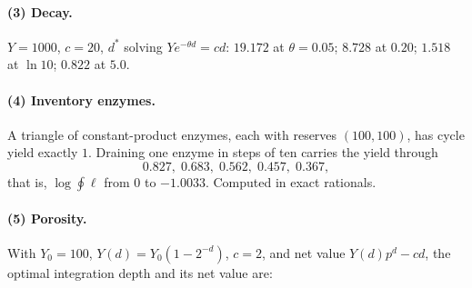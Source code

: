 \paragraph{(3) Decay.} $Y = 1000$, $c = 20$, $d^\ast$ solving
$Ye^{-\theta d} = cd$: $19.172$ at $\theta = 0.05$; $8.728$ at $0.20$;
$1.518$ at $\ln 10$; $0.822$ at $5.0$.

\paragraph{(4) Inventory enzymes.} A triangle of constant-product enzymes,
each with reserves $(100,100)$, has cycle yield exactly $1$. Draining one
enzyme in steps of ten carries the yield through
\[
  0.827,\; 0.683,\; 0.562,\; 0.457,\; 0.367,
\]
that is, $\log \oint \ell$ from $0$ to $-1.0033$. Computed in exact
rationals.

\paragraph{(5) Porosity.} With $Y_0 = 100$, $Y(d) = Y_0(1-2^{-d})$,
$c = 2$, and net value $Y(d)p^d - cd$, the optimal integration depth and
its net value are:

\begin{center}\small
{}
\end{center}

